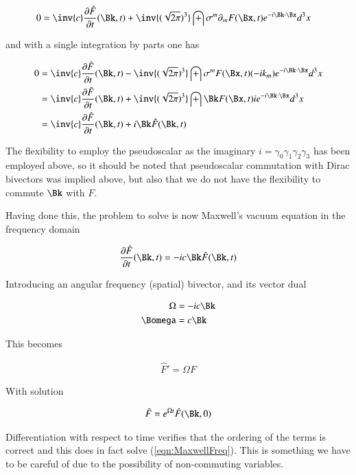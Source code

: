 \begin{align*}
0 &= \inv{c} \PD{t}{\hat{F}}(\Bk,t) + \inv{(\sqrt{2\pi})^3} \int \sigma^m \partial_m F(\Bx,t) e^{-i \Bk \cdot \Bx} d^3 x
\end{align*}

and with a single integration by parts one has

\begin{align*}
0
&= \inv{c} \PD{t}{\hat{F}}(\Bk,t) - \inv{(\sqrt{2\pi})^3} \int \sigma^m F(\Bx,t) (-i k_m) e^{-i \Bk \cdot \Bx} d^3 x \\
&= \inv{c} \PD{t}{\hat{F}}(\Bk,t) + \inv{(\sqrt{2\pi})^3} \int \Bk F(\Bx,t) i e^{-i \Bk \cdot \Bx} d^3 x \\
&= \inv{c} \PD{t}{\hat{F}}(\Bk,t) + i \Bk \hat{F}(\Bk,t)
\end{align*}

The flexibility to employ the pseudoscalar as the imaginary $i = \gamma_0 \gamma_1 \gamma_2 \gamma_3$ has been employed above, so it should be noted that pseudoscalar commutation with Dirac bivectors was implied above, but also that we do not have the flexibility to commute $\Bk$ with $F$.

Having done this, the problem to solve is now Maxwell's vacuum equation in the frequency domain

\begin{align*}
\PD{t}{\hat{F}}(\Bk,t) = -i c \Bk \hat{F}(\Bk,t)
\end{align*}

Introducing an angular frequency (spatial) bivector, and its vector dual

\begin{align}
\Omega &= -i c \Bk \\
\Bomega &= c \Bk
\end{align}

This becomes

\begin{align}\label{eqn:MaxwellFreq}
\hat{F}' = \Omega F
\end{align}

With solution

\begin{align}
\hat{F} = e^{\Omega t} \hat{F}(\Bk,0)
\end{align}

Differentiation with respect to time verifies that the ordering of the terms is correct and this does in fact solve (\ref{eqn:MaxwellFreq}).  This is something we have to be careful of due to the possibility of non-commuting variables.


